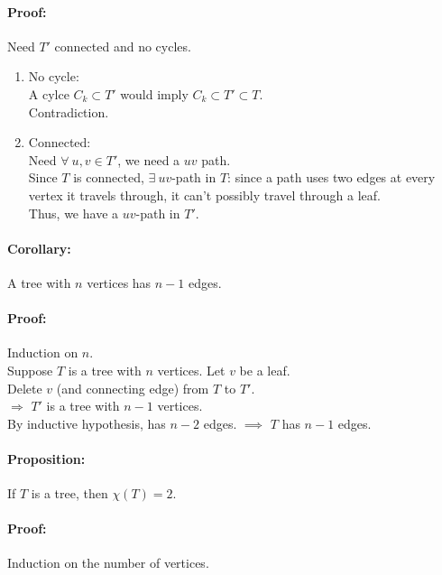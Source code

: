 \documentclass[a4paper, 11pt, twoside]{article}
\begin{document}
\paragraph{Proof:} Need $T'$ connected and no cycles.\\

\begin{enumerate}
	\item No cycle:\\
	A cylce $C_k\subset T'$ would imply $C_k\subset T' \subset T$.\\
	Contradiction.
	\item Connected:\\
	Need $\forall\ u, v \in T'$, we need a $uv$ path.\\
	Since $T$ is connected, $\exists\ uv$-path in $T$: since a path uses two edges at every vertex it travels through, it can't possibly travel through a leaf.\\
	Thus, we have a $uv$-path in $T'$.
\end{enumerate}

\paragraph{Corollary:} A tree with $n$ vertices has $n-1$ edges.

\paragraph{Proof:} Induction on $n$.\\

Suppose $T$ is a tree with $n$ vertices. Let $v$ be a leaf.\\

Delete $v$ (and connecting edge) from $T$ to $T'$.\\

$\Longrightarrow$ $T'$ is a tree with $n-1$ vertices.\\

By inductive hypothesis, has $n-2$ edges. $\implies$ $T$ has $n-1$ edges.

\paragraph{Proposition:} If $T$ is a tree, then $\chi(T)=2$.

\paragraph{Proof:} Induction on the number of vertices.\\
\end{document}
